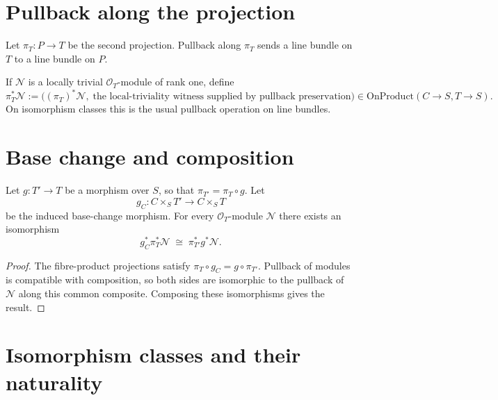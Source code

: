 \section{Pullback along the projection}
\label{sec:lbp_pullback_projection}

Let $\pi_T:P\to T$ be the second projection.  Pullback along $\pi_T$ sends a
line bundle on $T$ to a line bundle on $P$.

\begin{definition}\leanok
  \label{def:pullback_along_projection}
  If $\mathcal N$ is a locally trivial $\mathcal O_T$-module of rank one, define
  \[
    \pi_T^*\mathcal N
      :=\bigl((\pi_T)^*\mathcal N,\;\text{the local-triviality witness
         supplied by pullback preservation}\bigr)
      \in \mathrm{OnProduct}(C\to S,T\to S).
  \]
  On isomorphism classes this is the usual pullback operation on line bundles.
\end{definition}

\section{Base change and composition}
\label{sec:lbp_compose}

\begin{lemma}\leanok
  \label{lem:pullback_compose}
  Let $g:T'\to T$ be a morphism over $S$, so that
  $\pi_{T'}=\pi_T\circ g$.  Let
  \[
    g_C:C\times_S T'\longrightarrow C\times_S T
  \]
  be the induced base-change morphism.  For every $\mathcal O_T$-module
  $\mathcal N$ there exists an isomorphism
  \[
    g_C^*\pi_T^*\mathcal N
      \;\cong\;\pi_{T'}^*g^*\mathcal N.
  \]
\end{lemma}
\begin{proof}
  \leanok
  The fibre-product projections satisfy
  $\pi_T\circ g_C=g\circ\pi_{T'}$.  Pullback of modules is compatible with
  composition, so both sides are isomorphic to the pullback of $\mathcal N$
  along this common composite.  Composing these isomorphisms gives the result.
\end{proof}

\section{Isomorphism classes and their naturality}
\label{sec:lbp_relpic_quotient}

